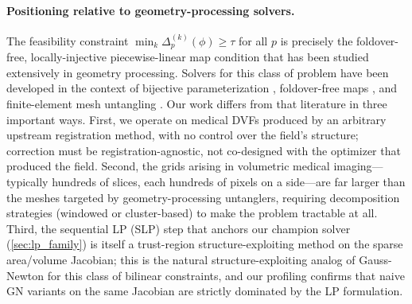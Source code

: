 \documentclass[lettersize,journal]{IEEEtran}
\begin{document}
\paragraph{Positioning relative to geometry-processing solvers.}
The feasibility constraint $\min_k \Delta^{(k)}_p(\phi) \geq \tau$ for all $p$ is precisely the foldover-free, locally-injective piecewise-linear map condition that has been studied extensively in geometry processing. Solvers for this class of problem have been developed in the context of bijective parameterization \cite{schuller2013lim, smith2015bijective, du2020lifting}, foldover-free maps \cite{garanzha2021foldfree}, and finite-element mesh untangling \cite{knupp2001untangling, toulorge2013robust}. Our work differs from that literature in three important ways. First, we operate on medical DVFs produced by an arbitrary upstream registration method, with no control over the field's structure; correction must be registration-agnostic, not co-designed with the optimizer that produced the field. Second, the grids arising in volumetric medical imaging—typically hundreds of slices, each hundreds of pixels on a side—are far larger than the meshes targeted by geometry-processing untanglers, requiring decomposition strategies (windowed or cluster-based) to make the problem tractable at all. Third, the sequential LP (SLP) step that anchors our champion solver (\autoref{sec:lp_family}) is itself a trust-region structure-exploiting method on the sparse area/volume Jacobian; this is the natural structure-exploiting analog of Gauss-Newton for this class of bilinear constraints, and our profiling confirms that naive GN variants on the same Jacobian are strictly dominated by the LP formulation.

\end{document}
